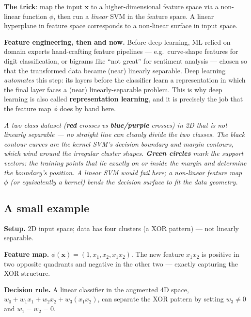 \documentclass[11pt, a4paper]{article}
\begin{document}
\textbf{The trick}: map the input $\mathbf{x}$ to a higher-dimensional feature space via a non-linear function $\phi$, then run a \emph{linear} SVM in the feature space. A linear hyperplane in feature space corresponds to a non-linear surface in input space.

\textbf{Feature engineering, then and now.} Before deep learning, ML relied on domain experts hand-crafting feature pipelines — e.g.\ curve-shape features for digit classification, or bigrams like ``not great'' for sentiment analysis — chosen so that the transformed data became (near) linearly separable. Deep learning \emph{automates} this step: its layers before the classifier learn a representation in which the final layer faces a (near) linearly-separable problem. This is why deep learning is also called \textbf{representation learning}, and it is precisely the job that the feature map $\phi$ does by hand here.

\begin{center}

\footnotesize\textit{A two-class dataset (\textbf{red} crosses vs \textbf{blue/purple} crosses) in 2D that is \emph{not} linearly separable --- no straight line can cleanly divide the two classes. The black contour curves are the kernel SVM's decision boundary and margin contours, which wind around the irregular cluster shapes. \textbf{Green circles} mark the support vectors: the training points that lie exactly on or inside the margin and determine the boundary's position. A linear SVM would fail here; a non-linear feature map $\phi$ (or equivalently a kernel) bends the decision surface to fit the data geometry.}
\end{center}

\subsection{A small example}

\textbf{Setup.} 2D input space; data has four clusters (a XOR pattern) — not linearly separable.

\textbf{Feature map.} $\phi(\mathbf{x}) = (1, x_1, x_2, x_1 x_2)$. The new feature $x_1 x_2$ is positive in two opposite quadrants and negative in the other two — exactly capturing the XOR structure.

\textbf{Decision rule.} A linear classifier in the augmented 4D space, $w_0 + w_1 x_1 + w_2 x_2 + w_3 (x_1 x_2)$, can separate the XOR pattern by setting $w_3 \ne 0$ and $w_1 = w_2 = 0$.
\end{document}
